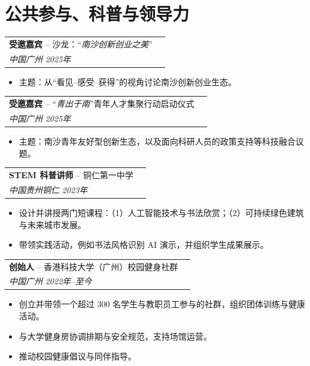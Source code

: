 \section*{公共参与、科普与领导力}

\noindent
\begin{tabularx}{\textwidth}{@{}Xr@{}}
\textbf{受邀嘉宾} -- 沙龙：“\textit{南沙创新创业之美}” \\
\textit{中国广州} \hfill \textit{2025年}
\end{tabularx}
\begin{itemize}[leftmargin=*]
  \item 主题：从“看见--感受--获得”的视角讨论南沙创新创业生态。
\end{itemize}

\noindent
\begin{tabularx}{\textwidth}{@{}Xr@{}}
\textbf{受邀嘉宾} -- “\textit{青出于南}”青年人才集聚行动启动仪式\\
\textit{中国广州} \hfill \textit{2025年}
\end{tabularx}
\begin{itemize}[leftmargin=*]
  \item 主题：南沙青年友好型创新生态，以及面向科研人员的政策支持等科技融合议题。
\end{itemize}

\noindent
\begin{tabularx}{\textwidth}{@{}Xr@{}}
\textbf{STEM 科普讲师} -- 铜仁第一中学 \\
\textit{中国贵州铜仁} \hfill \textit{2023年}
\end{tabularx}
\begin{itemize}[leftmargin=*]
  \item 设计并讲授两门短课程：（1）人工智能技术与书法欣赏；（2）可持续绿色建筑与未来城市发展。
  \item 带领实践活动，例如书法风格识别 AI 演示，并组织学生成果展示。
\end{itemize}

\noindent
\begin{tabularx}{\textwidth}{@{}Xr@{}}
\textbf{创始人} -- 香港科技大学（广州）校园健身社群  \\
\textit{中国广州} \hfill \textit{2022年--至今}
\end{tabularx}
\begin{itemize}[leftmargin=*]
  \item 创立并带领一个超过 300 名学生与教职员工参与的社群，组织团体训练与健康活动。
  \item 与大学健身房协调排期与安全规范，支持场馆运营。
  \item 推动校园健康倡议与同伴指导。
\end{itemize}

